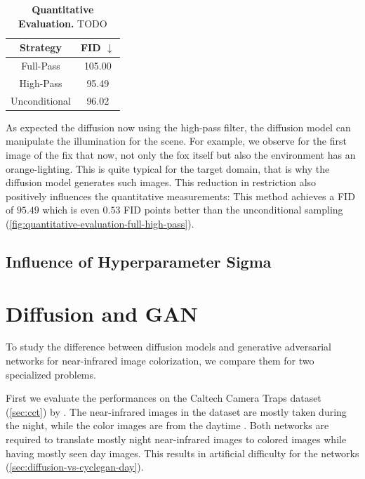 \begin{table}[htp!]
    \centering
    \begin{tabular}{c | c}
        Strategy      & FID  $\downarrow$ \\
        \hline\hline
        Full-Pass     & 105.00            \\
        High-Pass     & 95.49             \\
        Unconditional & 96.02
    \end{tabular}
    \caption{
        \textbf{Quantitative Evaluation.} TODO
    }
    \label{fig:quantitative-evaluation-full-high-pass}
\end{table}


As expected the diffusion now using the high-pass filter, the diffusion model can manipulate the illumination for the scene.
For example, we observe for the first image of the fix that now, not only the fox itself but also the environment has an orange-lighting.
This is quite typical for the target domain, that is why the diffusion model generates such images. 
This reduction in restriction also positively influences the quantitative measurements: 
This method achieves a FID of $95.49$ which is even $0.53$ FID points better than the unconditional sampling (\autoref{fig:quantitative-evaluation-full-high-pass}).

\subsection{Influence of Hyperparameter Sigma}




\section{Diffusion and GAN}
To study the difference between diffusion models and generative adversarial networks for near-infrared image colorization, we compare them for two specialized problems.

First we evaluate the performances on the Caltech Camera Traps dataset (\autoref{sec:cct}) by .
The near-infrared images in the dataset are mostly taken during the night, while the color images are from the daytime \parencite{caltech}.
Both networks are required to translate mostly night near-infrared images to colored images while having mostly seen day images.
This results in artificial difficulty for the networks (\autoref{sec:diffusion-vs-cyclegan-day}).

